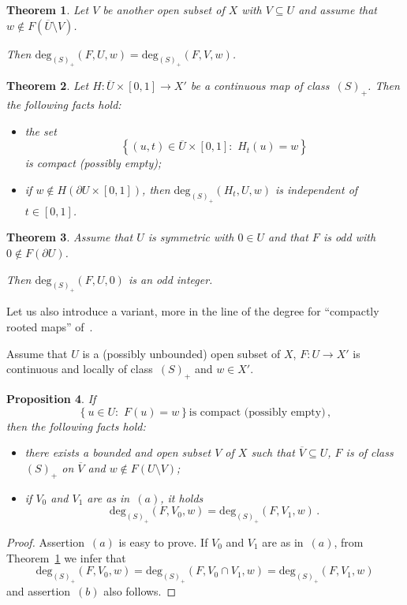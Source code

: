 \documentclass[twoside,reqno]{amsart}
\numberwithin{equation}{section}
\newtheorem{thm}{Theorem}[section]
\newtheorem{prop}[thm]{Proposition}
\theoremstyle{definition}
\newcommand{\cl}[1]{\overline{#1}}
\begin{document}
%
\begin{thm}
\label{thm:excisionw}
Let $V$ be another open subset of $X$ with
$V\subseteq U$ and assume that 
$w\not\in F(\overline{U}\setminus V)$.
\par
Then $\mathrm{deg}_{(S)_+}(F,U,w) = 
\mathrm{deg}_{(S)_+}(F,V,w)$.
\end{thm}
%
\begin{thm}
\label{thm:homotopyw}
Let $H:\overline{U}\times[0,1]\rightarrow X'$
be a continuous map of class~$(S)_+$.
Then the following facts hold:
\begin{itemize}
\item[$(a)$]
the set
\[
\left\{(u,t)\in\cl{U}\times[0,1]:\,\,
H_t(u)=w\right\}
\]
is compact (possibly empty);
\item[$(b)$]
if $w\not\in H(\partial{U}\times[0,1])$,
then $\mathrm{deg}_{(S)_+}(H_{t},U,w)$ is independent of
$t\in[0,1]$.
\end{itemize}
\end{thm}
%
\begin{thm}
\label{thm:oddw}
Assume that $U$ is symmetric with $0\in U$ and that $F$
is odd with $0\not\in F(\partial U)$.
\par
Then 
$\mathrm{deg}_{(S)_+}(F,U,0)$
is an odd integer.
\end{thm}
%
Let us also introduce a variant, more in the line
of the degree for ``compactly rooted maps'' 
of~\cite{dugundji_granas2003}.
\par
Assume that $U$ is a (possibly unbounded) open subset of $X$, 
$F:U\rightarrow X'$ is continuous and locally of class~$(S)_+$ 
and $w\in X'$.
%
\begin{prop}
\label{prop:c}
If 
\begin{equation}
\label{eq:compactsol}
\text{$\left\{u\in U:\,\,F(u)=w\right\}$
is compact (possibly empty)}\,,
\end{equation}
then the following facts hold:
\begin{itemize}
\item[$(a)$]
there exists a bounded and open subset $V$ of $X$ such that
$\cl{V}\subseteq U$, $F$ is of class~$(S)_+$ on $\cl{V}$
and $w\not\in F(U\setminus V)$;
\item[$(b)$]
if $V_0$ and $V_1$ are as in~$(a)$, it holds
\[
\mathrm{deg}_{(S)_+}(F,V_0,w) = \mathrm{deg}_{(S)_+}(F,V_1,w)\,.
\]
\end{itemize}
\end{prop}
%
\begin{proof}
Assertion~$(a)$ is easy to prove. 
If $V_0$ and $V_1$ are as in~$(a)$, from 
Theorem~\ref{thm:excisionw} we infer that
\[
\mathrm{deg}_{(S)_+}(F,V_0,w) =
\mathrm{deg}_{(S)_+}(F,V_0\cap V_1,w) =
\mathrm{deg}_{(S)_+}(F,V_1,w)
\]
and assertion~$(b)$ also follows.
\end{proof}
\end{document}
